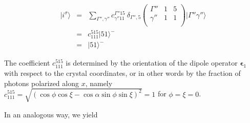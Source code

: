\documentclass[twocolumn,prb,twocolumn,amsmath,superscriptaddress,nofootinbib,amssymb]{revtex4-1}
\newcommand{\vect}[1]{\boldsymbol{#1}}
\begin{document}
\begin{widetext}
\begin{eqnarray}
|i^{\sigma}\rangle&=&\sum_{\Gamma'',\gamma''} c^{\Gamma''15}_{\gamma''11}~\delta_{\Gamma'',5} \left(
                                                                             \begin{array}{ccc}
                                                                               \Gamma'' & 1 & 5 \\
                                                                                \gamma''& 1 & 1 \\
                                                                             \end{array}
                                                                           \right)|\Gamma''\gamma''\rangle \nonumber\\
&=&c^{515}_{111}|51\rangle^- \nonumber\\
&=&|51\rangle^-
\end{eqnarray}



\noindent  The coefficient $c^{515}_{111}$ is determined by the orientation of the dipole operator $\vect{\epsilon}_1$ with respect to the crystal coordinates, or in other words by the fraction of photons polarized along $x$, namely $c^{515}_{111}=\sqrt{(\cos\phi\cos\xi-\cos\alpha\sin\phi\sin\xi)^2}=1$ for $\phi=\xi=0$.


In an analogous way, we yield


\end{widetext}
\end{document}
